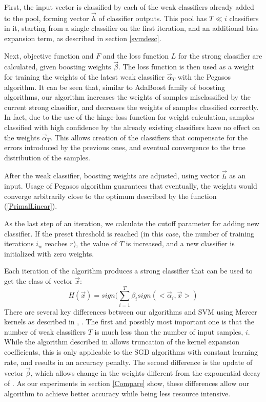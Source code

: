 \documentclass[10pt,twocolumn, a4paper]{article}
\begin{document}
First, the input vector is classified by each of the weak classifiers already added to the pool, forming vector $\vec{h}$ of classifier outputs. This pool has $T \ll i$ classifiers in it, starting from a single classifier on the first iteration, and an additional bias expansion term, as described in section \ref{svmdesc}. 

Next, objective function and $F$ and the loss function $L$ for the strong classifier  are calculated, given boosting weights $\vec{\beta}$. 
The loss function is then used as a weight for training the weights of the latest weak classifier $\vec{\alpha}_T$ with the Pegasos algorithm. It can be seen that, similar to AdaBoost family of boosting algorithms, our algorithm increases the weights of  samples misclassified by the current strong classifier, and decreases the weights of samples classified correctly. In fact, due to the use of the hinge-loss function for weight calculation, samples classified with high confidence by the already existing classifiers have no effect on the weights $\vec{\alpha}_T$. This allows creation of the classifiers that compensate for the errors introduced by the previous ones, and eventual convergence to the true distribution of the samples. 

After the weak classifier, boosting weights are adjusted, using vector $\vec{h}$ as an input. Usage of Pegasos algorithm guarantees that eventually, the weights would converge arbitrarily close to the optimum described by the function (\ref{PrimalLinear}).

As the last step of an iteration, we calculate the cutoff parameter for adding new classifier. If the preset threshold is reached (in this case, the number of training iterations $i_w$ reaches $r$), the value of $T$ is increased, and a new classifier is initialized with zero weights.

Each iteration of the algorithm produces a strong classifier that can be used to get the class of vector $\vec{x}$:
\begin{equation}
\label{Strong}
H(\vec{x})=sign(\sum_{i=1}^{T}{\beta_i sign(<\vec{\alpha}_i,\vec{x}>)}
\end{equation}
There are several key differences between our algorithms and SVM using Mercer kernels as described in \cite{Pegasos}, \cite{Norma}. The first and possibly most important one is that the number of weak classifiers $T$ is much less than the number of input samples, $i$. While the algorithm described in \cite{Norma} allows truncation of the kernel expansion coefficients, this is only applicable to the SGD algorithms with constant learning rate, and results in an accuracy penalty. The second difference is the update of vector $\vec{\beta}$, which allows change in the weights different from the exponential decay of \cite{Norma}. As our experiments in section \ref{Compare} show, these differences allow our algorithm to achieve better accuracy while being less resource intensive.
\end{document}
